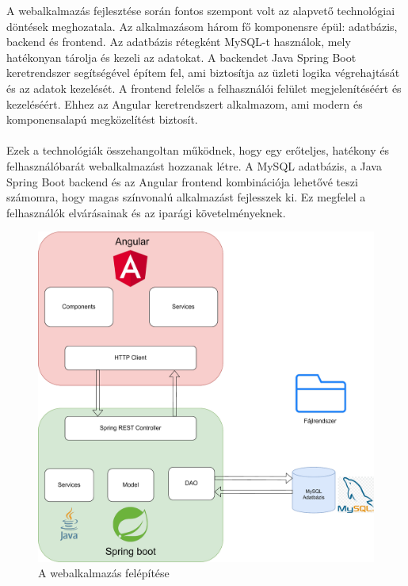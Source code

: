 




A webalkalmazás fejlesztése során fontos szempont volt az alapvető technológiai döntések meghozatala. Az alkalmazásom három fő komponensre épül: adatbázis, backend és frontend. Az adatbázis rétegként MySQL-t használok, mely hatékonyan tárolja és kezeli az adatokat. A backendet Java Spring Boot keretrendszer segítségével építem fel, ami biztosítja az üzleti logika végrehajtását és az adatok kezelését. A frontend felelős a felhasználói felület megjelenítéséért és kezeléséért. Ehhez az Angular keretrendszert alkalmazom, ami modern és komponensalapú megközelítést biztosít.\\
\\
Ezek a technológiák összehangoltan működnek, hogy egy erőteljes, hatékony és felhasználóbarát webalkalmazást hozzanak létre. A MySQL adatbázis, a Java Spring Boot backend és az Angular frontend kombinációja lehetővé teszi számomra, hogy magas színvonalú alkalmazást fejlesszek ki. Ez megfelel a felhasználók elvárásainak és az iparági követelményeknek.

\begin{figure}[h]
\centering
\includegraphics[width=\textwidth]{images/g48.pdf}
\caption{A webalkalmazás felépítése}
\label{fig:felepites}
\end{figure}

